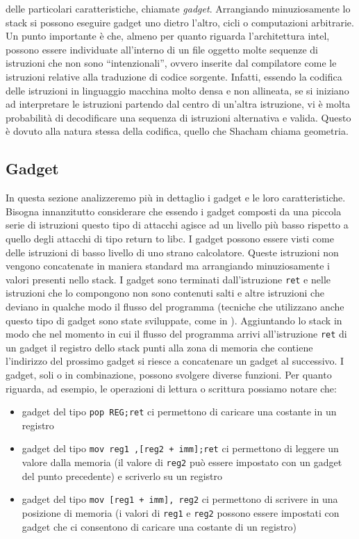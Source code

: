 delle particolari caratteristiche, chiamate \emph{gadget}. Arrangiando
minuziosamente lo stack si possono eseguire gadget uno dietro l'altro,
cicli o computazioni arbitrarie. Un punto importante è che, almeno per
quanto riguarda l'architettura intel, possono essere individuate
all'interno di un file oggetto molte sequenze di istruzioni che non
sono ``intenzionali'', ovvero inserite dal compilatore come le
istruzioni relative alla traduzione di codice sorgente. Infatti,
essendo la codifica delle istruzioni in linguaggio macchina molto
densa e non allineata, se si iniziano ad interpretare le istruzioni
partendo dal centro di un'altra istruzione, vi è molta probabilità di
decodificare una sequenza di istruzioni alternativa e valida. Questo è
dovuto alla natura stessa della codifica, quello che Shacham chiama
geometria.

\subsection{Gadget}

In questa sezione analizzeremo più in dettaglio i gadget e le loro
caratteristiche. Bisogna innanzitutto considerare che essendo i gadget
composti da una piccola serie di istruzioni questo tipo di attacchi
agisce ad un livello più basso rispetto a quello degli attacchi di
tipo return to libc. I gadget possono essere visti come delle
istruzioni di basso livello di uno strano calcolatore. Queste
istruzioni non vengono concatenate in maniera standard ma arrangiando
minuziosamente i valori presenti nello stack. I gadget sono terminati
dall'istruzione \lstinline{ret} e nelle istruzioni che lo compongono
non sono contenuti salti e altre istruzioni che deviano in qualche
modo il flusso del programma (tecniche che utilizzano anche questo
tipo di gadget sono state sviluppate, come in
\cite{Checkoway-10}). Aggiuntando lo stack in modo che nel momento in
cui il flusso del programma arrivi all'istruzione \lstinline{ret} di
un gadget il registro dello stack punti alla zona di memoria che
contiene l'indirizzo del prossimo gadget si riesce a concatenare un
gadget al successivo. I gadget, soli o in combinazione, possono
svolgere diverse funzioni. Per quanto riguarda, ad esempio, le
operazioni di lettura o scrittura possiamo notare che:

\begin{itemize}
\item gadget del tipo \lstinline{pop REG;ret} ci permettono di
caricare una costante in un registro

\item gadget del tipo \lstinline{mov reg1 ,[reg2 + imm];ret} ci
  permettono di leggere un valore dalla memoria (il valore di
  \lstinline{reg2} può essere impostato con un gadget del punto
  precedente) e scriverlo su un registro

\item gadget del tipo \lstinline{mov [reg1 + imm], reg2} ci permettono
  di scrivere in una posizione di memoria (i valori di
  \lstinline{reg1} e \lstinline{reg2} possono essere impostati con
  gadget che ci consentono di caricare una costante di un registro)
\end{itemize}

